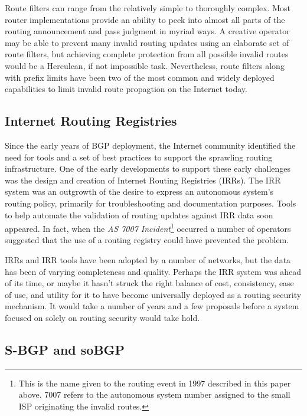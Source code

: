 \documentclass[sigconf]{acmart}
\begin{document}
Route filters can range from the relatively simple to thoroughly
complex.  Most router implementations provide an ability to peek into
almost all parts of the routing announcement and pass judgment in myriad
ways.  A creative operator may be able to prevent many invalid routing
updates using an elaborate set of route filters, but achieving complete
protection from all possible invalid routes would be a Herculean, if not
impossible task.  Nevertheless, route filters along with prefix limits
have been two of the most common and widely deployed capabilities to
limit invalid route propagtion on the Internet
today.\cite{durand_bgp_2015}

\subsection{Internet Routing Registries}

Since the early years of BGP deployment, the Internet community
identified the need for tools and a set of best practices to support the
sprawling routing infrastructure.  One of the early developments to
support these early challenges was the design and creation of Internet
Routing Registries (IRRs).\cite{bates_representation_1995}  The IRR
system was an outgrowth of the desire to express an autonomous system's
routing policy, primarily for troubleshooting and documentation
purposes.  Tools to help automate the validation of routing updates
against IRR data soon appeared.  In fact, when the \emph{AS 7007
Incident}\footnote{This is the name given to the routing event in 1997
described in this paper above.  7007 refers to the autonomous system
number assigned to the small ISP originating the invalid routes.}
occurred a number of operators suggested that the use of a routing
registry could have prevented the problem.

IRRs and IRR tools have been adopted by a number of networks, but the
data has been of varying completeness and
quality.\cite{khan_comparative_2013}  Perhaps the IRR system was ahead
of its time, or maybe it hasn't struck the right balance of cost,
consistency, ease of use, and utility for it to have become universally
deployed as a routing security mechanism.  It would take a number of
years and a few proposals before a system focused on solely on routing
security would take hold.

\subsection{S-BGP and soBGP}
\end{document}

